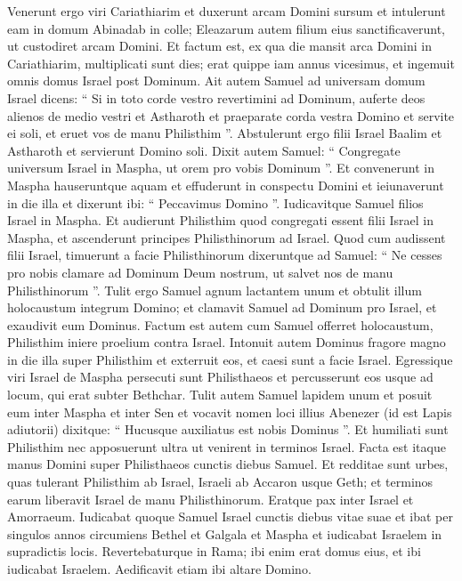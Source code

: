 \begin{biblechapter}
\begin{biblechapter}
\begin{biblechapter}
\begin{biblechapter}
\begin{biblechapter}
\begin{biblechapter}
\begin{biblechapter}
\verse Venerunt ergo viri Cariathiarim et duxerunt arcam Domini sursum et intulerunt eam in domum Abinadab in colle; Eleazarum autem filium eius sanctificaverunt, ut custodiret arcam Domini.
 \verse Et factum est, ex qua die mansit arca Domini in Cariathiarim, multiplicati sunt dies; erat quippe iam annus vicesimus, et ingemuit omnis domus Israel post Dominum. 
\verse Ait autem Samuel ad universam domum Israel dicens: “ Si in toto corde vestro revertimini ad Dominum, auferte deos alienos de medio vestri et Astharoth et praeparate corda vestra Domino et servite ei soli, et eruet vos de manu Philisthim ”. 
\verse Abstulerunt ergo filii Israel Baalim et Astharoth et servierunt Domino soli.
 \verse Dixit autem Samuel: “ Congregate universum Israel in Maspha, ut orem pro vobis Dominum ”. 
\verse Et convenerunt in Maspha hauseruntque aquam et effuderunt in conspectu Domini et ieiunaverunt in die illa et dixerunt ibi: “ Peccavimus Domino ”. Iudicavitque Samuel filios Israel in Maspha.
 \verse Et audierunt Philisthim quod congregati essent filii Israel in Maspha, et ascenderunt principes Philisthinorum ad Israel. Quod cum audissent filii Israel, timuerunt a facie Philisthinorum 
\verse dixeruntque ad Samuel: “ Ne cesses pro nobis clamare ad Dominum Deum nostrum, ut salvet nos de manu Philisthinorum ”. 
\verse Tulit ergo Samuel agnum lactantem unum et obtulit illum holocaustum integrum Domino; et clamavit Samuel ad Dominum pro Israel, et exaudivit eum Dominus. 
\verse Factum est autem cum Samuel offerret holocaustum, Philisthim iniere proelium contra Israel. Intonuit autem Dominus fragore magno in die illa super Philisthim et exterruit eos, et caesi sunt a facie Israel. 
\verse Egressique viri Israel de Maspha persecuti sunt Philisthaeos et percusserunt eos usque ad locum, qui erat subter Bethchar. 
\verse Tulit autem Samuel lapidem unum et posuit eum inter Maspha et inter Sen et vocavit nomen loci illius Abenezer (id est Lapis adiutorii) dixitque: “ Hucusque auxiliatus est nobis Dominus ”.
 \verse Et humiliati sunt Philisthim nec apposuerunt ultra ut venirent in terminos Israel. Facta est itaque manus Domini super Philisthaeos cunctis diebus Samuel. 
\verse Et redditae sunt urbes, quas tulerant Philisthim ab Israel, Israeli ab Accaron usque Geth; et terminos earum liberavit Israel de manu Philisthinorum. Eratque pax inter Israel et Amorraeum.
 \verse Iudicabat quoque Samuel Israel cunctis diebus vitae suae 
\verse et ibat per singulos annos circumiens Bethel et Galgala et Maspha et iudicabat Israelem in supradictis locis. Revertebaturque in Rama; ibi enim erat domus eius, et ibi iudicabat Israelem. Aedificavit etiam ibi altare Domino.
 

\end{biblechapter}
\end{biblechapter}
\end{biblechapter}
\end{biblechapter}
\end{biblechapter}
\end{biblechapter}
\end{biblechapter}
